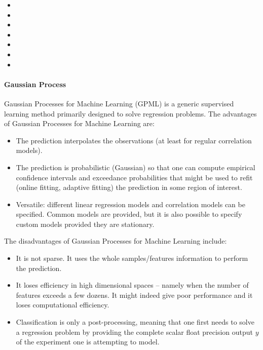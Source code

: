 
\begin{itemize}
  \item {}
  \item {}
  \item {}
  \item {}
  \item {}
  \item {}
  \item {}
\end{itemize}

\paragraph{Gaussian Process}
\label{GP}
Gaussian Processes for Machine Learning (GPML) is a generic supervised learning
method primarily designed to solve regression problems.
%
The advantages of Gaussian Processes for Machine Learning are:
\begin{itemize}
  \item The prediction interpolates the observations (at least for regular
  correlation models).
  \item The prediction is probabilistic (Gaussian) so that one can compute
  empirical confidence intervals and exceedance probabilities that might be used
  to refit (online fitting, adaptive fitting) the prediction in some region of
  interest.
  \item Versatile: different linear regression models and correlation models can
  be specified.
  Common models are provided, but it is also possible to specify custom models
  provided they are stationary.
\end{itemize}
The disadvantages of Gaussian Processes for Machine Learning include:
\begin{itemize}
  \item It is not sparse.
  It uses the whole samples/features information to perform the prediction.
  \item It loses efficiency in high dimensional spaces – namely when the
  number of features exceeds a few dozens.
  It might indeed give poor performance and it loses computational efficiency.
  \item Classification is only a post-processing, meaning that one first needs
  to solve a regression problem by providing the complete scalar float precision
  output $y$ of the experiment one is attempting to model.
\end{itemize}

